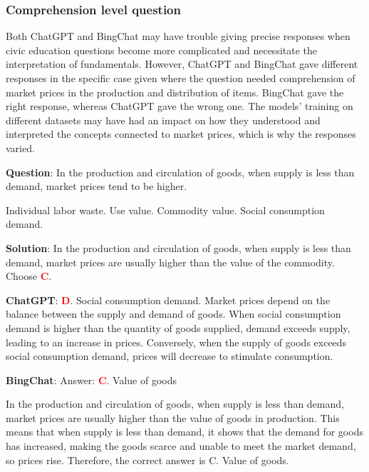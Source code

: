 \documentclass{article}
\begin{document}
{	\subsubsection{Comprehension level question}
	\label{VNHSGE_Civ_C}
	
	Both ChatGPT and BingChat may have trouble giving precise responses when civic education questions become more complicated and necessitate the interpretation of fundamentals. However, ChatGPT and BingChat gave different responses in the specific case given where the question needed comprehension of market prices in the production and distribution of items. BingChat gave the right response, whereas ChatGPT gave the wrong one. The models' training on different datasets may have had an impact on how they understood and interpreted the concepts connected to market prices, which is why the responses varied.
	
	
	
	\begin{mdframed}[linewidth=1pt,linecolor=red] \textbf{Question}: In the production and circulation of goods, when supply is less than demand, market prices tend to be higher.
		
		\begin{choices}
			\choice Individual labor waste.
			\choice Use value.
			\choice Commodity value.
			\choice Social consumption demand.
		\end{choices}
		
		\textbf{Solution}: In the production and circulation of goods, when supply is less than demand, market prices are usually higher than the value of the commodity.	Choose \textcolor{red}{\textbf{C}}.
		
		\textbf{ChatGPT}: \textcolor{red}{\textbf{D}}. Social consumption demand. Market prices depend on the balance between the supply and demand of goods. When social consumption demand is higher than the quantity of goods supplied, demand exceeds supply, leading to an increase in prices. Conversely, when the supply of goods exceeds social consumption demand, prices will decrease to stimulate consumption.
		
		\textbf{BingChat}: Answer: \textcolor{red}{\textbf{C}}. Value of goods
		
		In the production and circulation of goods, when supply is less than demand, market prices are usually higher than the value of goods in production. This means that when supply is less than demand, it shows that the demand for goods has increased, making the goods scarce and unable to meet the market demand, so prices rise. Therefore, the correct answer is C. Value of goods.
		

\end{mdframed}}
\end{document}
